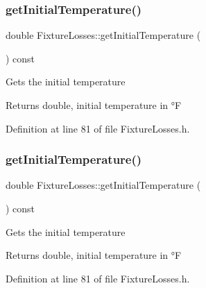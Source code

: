 \mbox{\label{class_fixture_losses_aaa2e1042b71482b377e93d675909f78e}} 
\subsubsection{\texorpdfstring{get\+Initial\+Temperature()}{getInitialTemperature()}\hspace{0.1cm}{\footnotesize\ttfamily [2/3]}}
{\footnotesize\ttfamily double Fixture\+Losses\+::get\+Initial\+Temperature (\begin{DoxyParamCaption}{ }\end{DoxyParamCaption}) const\hspace{0.3cm}{\ttfamily [inline]}}

Gets the initial temperature \begin{DoxyReturn}{Returns}
double, initial temperature in °F 
\end{DoxyReturn}


Definition at line 81 of file Fixture\+Losses.\+h.

\mbox{\label{class_fixture_losses_aaa2e1042b71482b377e93d675909f78e}} 
\subsubsection{\texorpdfstring{get\+Initial\+Temperature()}{getInitialTemperature()}\hspace{0.1cm}{\footnotesize\ttfamily [3/3]}}
{\footnotesize\ttfamily double Fixture\+Losses\+::get\+Initial\+Temperature (\begin{DoxyParamCaption}{ }\end{DoxyParamCaption}) const\hspace{0.3cm}{\ttfamily [inline]}}

Gets the initial temperature \begin{DoxyReturn}{Returns}
double, initial temperature in °F 
\end{DoxyReturn}


Definition at line 81 of file Fixture\+Losses.\+h.

